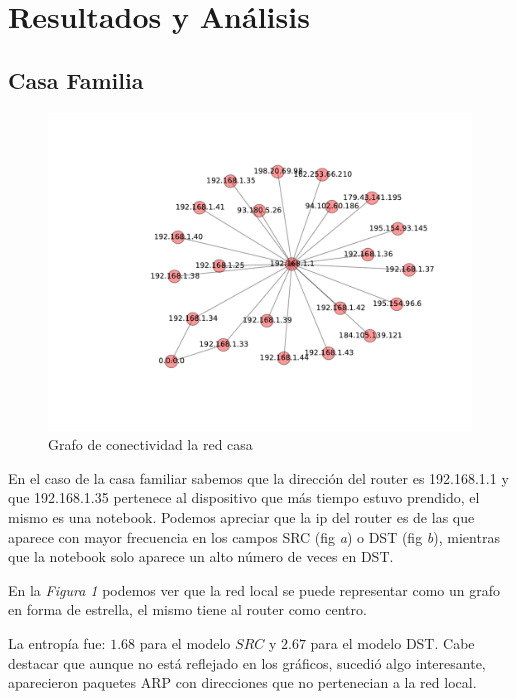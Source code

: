 \section{Resultados y An\'alisis}

\subsection{Casa Familia}

\FloatBarrier

\FloatBarrier

\begin{figure}[!h]
	\begin{center}
		  \includegraphics[scale=0.75]{resultados/casa/conectividadNX.pdf}
		  \caption{Grafo de conectividad la red casa}
		  \label{fig:contra1}
	\end{center}
\end{figure}
	
\FloatBarrier

En el caso de la casa familiar sabemos que la direcci\'on del router
es 192.168.1.1 y que 192.168.1.35 pertenece al dispositivo que m\'as tiempo estuvo
prendido, el mismo es una notebook. Podemos apreciar que la ip del
router es de las que aparece con mayor frecuencia en los campos SRC (fig \emph{a}) 
o DST (fig \emph{b}), mientras que la notebook solo aparece un alto n\'umero de 
veces en DST. 

En la \emph{Figura 1} podemos ver que la red local se puede representar como 
un grafo en forma de estrella, el mismo tiene al router como centro. 

La entrop\'ia fue: $1.68$ para el modelo $SRC$ y $2.67$ para el modelo DST.
Cabe destacar que aunque no est\'a reflejado en los gr\'aficos, sucedi\'o algo interesante, 
aparecieron paquetes ARP con direcciones que no pertenecian a la red local.

